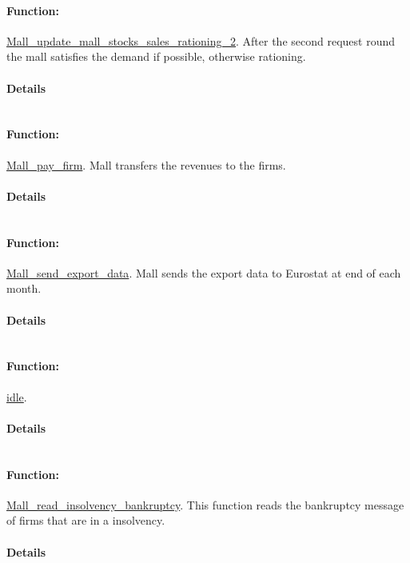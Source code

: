 \documentclass[a4paper,11pt]{article}
\begin{document}
\paragraph{Function:}\url{Mall_update_mall_stocks_sales_rationing_2}.
After the second request round the mall satisfies the demand if 
possible, otherwise rationing.
\paragraph{Details}
\begin{verbatim}
\end{verbatim}
\paragraph{Function:}\url{Mall_pay_firm}.
Mall transfers the revenues to the firms.
\paragraph{Details}
\begin{verbatim}
\end{verbatim}
\paragraph{Function:}\url{Mall_send_export_data}.
Mall sends the export data to Eurostat at end of each month.
\paragraph{Details}
\begin{verbatim}
\end{verbatim}
\paragraph{Function:}\url{idle}.

\paragraph{Details}
\begin{verbatim}
\end{verbatim}
\paragraph{Function:}\url{Mall_read_insolvency_bankruptcy}.
This function reads the bankruptcy message of firms that are in a insolvency.
\paragraph{Details}
\begin{verbatim}
\end{verbatim}
\end{document}
